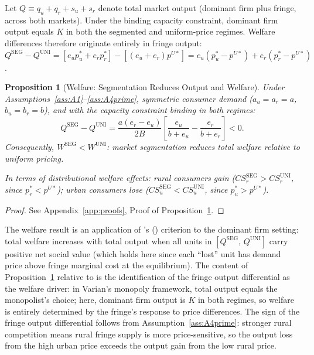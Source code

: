 \documentclass[12pt]{article}
\theoremstyle{plain}
\newtheorem{proposition}{Proposition}
\theoremstyle{definition}
\theoremstyle{remark}
\begin{document}
Let $Q \equiv q_u + q_r + s_u + s_r$ denote total market output (dominant firm
plus fringe, across both markets).  Under the binding capacity constraint,
dominant firm output equals $K$ in both the segmented and uniform-price regimes.
Welfare differences therefore originate entirely in fringe output:
$Q^{\mathrm{SEG}} - Q^{\mathrm{UNI}} = [e_u p_u^* + e_r p_r^*] - [(e_u + e_r)p^{U*}]
= e_u(p_u^* - p^{U*}) + e_r(p_r^* - p^{U*})$.

\begin{proposition}[Welfare: Segmentation Reduces Output and Welfare]
\label{prop:welfare}
Under Assumptions~\ref{ass:A1}--\ref{ass:A4prime}, symmetric consumer demand
($a_u = a_r = a$, $b_u = b_r = b$), and with the capacity constraint binding in
both regimes:
\begin{equation}
  Q^{\mathrm{SEG}} - Q^{\mathrm{UNI}} = \frac{a(e_r - e_u)}{2B}
  \left[\frac{e_u}{b + e_u} - \frac{e_r}{b + e_r}\right] < 0.
  \label{eq:Qdiff}
\end{equation}
Consequently, $W^{\mathrm{SEG}} < W^{\mathrm{UNI}}$: market segmentation reduces
total welfare relative to uniform pricing.

In terms of distributional welfare effects: rural consumers gain
($CS_r^{\mathrm{SEG}} > CS_r^{\mathrm{UNI}}$, since $p_r^* < p^{U*}$); urban
consumers lose ($CS_u^{\mathrm{SEG}} < CS_u^{\mathrm{UNI}}$, since
$p_u^* > p^{U*}$).
\end{proposition}

\begin{proof}
See Appendix~\ref{app:proofs}, Proof of Proposition~\ref{prop:welfare}.
\end{proof}

The welfare result is an application of \citeauthor{Varian1985}'s
(\citeyear{Varian1985}) criterion to the dominant firm setting: total welfare
increases with total output when all units in $[Q^{\mathrm{SEG}},\, Q^{\mathrm{UNI}}]$
carry positive net social value (which holds here since each ``lost'' unit has
demand price above fringe marginal cost at the equilibrium).  The content of
Proposition~\ref{prop:welfare} relative to \citeauthor{Varian1985} is the
identification of the fringe output differential as the welfare driver: in Varian's
monopoly framework, total output equals the monopolist's choice; here, dominant
firm output is $K$ in both regimes, so welfare is entirely determined by the
fringe's response to price differences.  The sign of the fringe output differential
follows from Assumption~\ref{ass:A4prime}: stronger rural competition means rural
fringe supply is more price-sensitive, so the output loss from the high urban price
exceeds the output gain from the low rural price.
\end{document}
